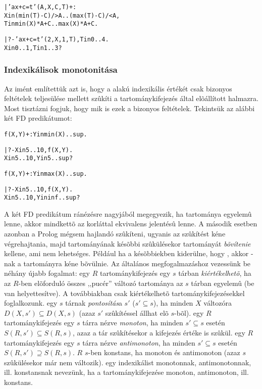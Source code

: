 \begin{alltt}
| 'ax+c=t'(A,X,C,T) +:  % feltétel: A > 0
        X in (min(T) - C) /> A .. (max(T) - C) /< A,
        T in min(X)*A + C      ..  max(X)*A + C.

| ?- 'ax+c=t'(2,X,1,T), T in 0..4.
X in 0..1, T in 1..3 ?
\end{alltt}

\subsubsection{Indexikálisok monotonitása}

Az imént említettük azt is, hogy a  alakú indexikális
 értékét csak bizonyos feltételek teljesülése mellett szûkíti
a  tartománykifejezés által elõállított halmazra. Most tisztázni fogjuk,
hogy mik is ezek a bizonyos feltételek. Tekintsük az alábbi két FD predikátumot:

\begin{alltt}
f(X, Y) +: Y in min(X)..sup.

| ?- X in 5..10, f(X, Y).
X in 5..10, Y in 5..sup?

f(X, Y) +: Y in max(X)..sup.

| ?- X in 5..10, f(X, Y).
X in 5..10, Y in inf..sup?
\end{alltt}

A két FD predikátum ránézésre nagyjából megegyezik, ha  tartománya egyelemû
lenne, akkor mindkettõ az  korláttal ekvivalens jelentésû lenne. A második
esetben azonban a Prolog mégsem hajlandó szûkíteni, ugyanis az 
szûkítést kéne végrehajtania, majd  tartományának késõbbi szûkülésekor 
tartományát \emph{bõvítenie} kellene, ami nem lehetséges. Például ha a késõbbiekben
kiderülne, hogy , akkor -nak a  tartományra kéne
bõvülnie.
\br
Az általános megfogalmazáshoz vezessünk be néhány újabb fogalmat:
\br
{} egy $R$ tartománykifejezés egy $s$ tárban \emph{kiértékelhetõ}, ha az
$R$-ben elõforduló összes ,,pucér'' változó tartománya az $s$ tárban
egyelemû (be van helyettesítve). A továbbiakban csak kiértékelhetõ
tartománykifejezésekkel foglalkozunk.
\br
{} egy $s$ tárnak \emph{pontosítás}a $s'$ ($s' \subseteq s$), ha minden
$X$ változóra $D(X,s') \subseteq D(X,s)$ (azaz $s'$ szûkítéssel állhat elõ $s$-bõl).
\br
{} egy $R$ tartománykifejezés egy $s$ tárra nézve \emph{monoton}, ha
minden $s' \subseteq s$ esetén $S(R,s') \subseteq S(R,s)$, azaz a tár
szûkítésekor a kifejezés értéke is szûkül.
\br
{} egy $R$ tartománykifejezés egy $s$ tárra nézve \emph{antimonoton}, ha
minden $s' \subseteq s$ esetén $S(R,s') \supseteq S(R,s)$.
\br
{} $R$ $s$-ben konstans, ha monoton és antimonoton (azaz $s$ szûkülésekor
már nem változik).
\br
{} egy indexikálist monotonnak, antimonotonnak, ill. konstansnak nevezünk,
ha a tartománykifejezése monoton, antimonoton, ill. konstans. 

